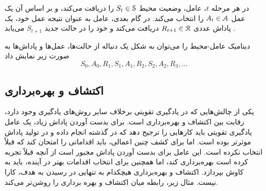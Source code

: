 در هر مرحله $t$، عامل، وضعیت محیط  
$S_t \in \EuScript{S}$
را دریافت می‌کند، و بر اساس آن یک عمل 
$A_t \in \EuScript{A}$
را انتخاب می‌کند. در گام بعدی، عامل به عنوان نتیجه عمل خود، یک پاداش عددی $R_{t+1} \in \EuScript{R}$ دریافت می‌کند و خود را در حالت جدید $S_{t+1}$ می‌یابد \cite{suttonbook}.


دینامیک عامل-محیط را می‌توان به شکل یک دنباله از حالت‌ها، عمل‌ها و پاداش‌ها به صورت زیر نمایش داد
$$S_0, A_0, R_1, S_1, A_1, R_2, S_2, A_2, R_3,...$$
\subsection*{اکتشاف و بهره‌برداری}
یکی از چالش‌هایی که در یادگیری تقویتی برخلاف سایر روش‌های یادگیری وجود دارد، رقابت بین اکتشاف و بهره‌برداری است. برای بدست آوردن پاداش زیاد، یک عامل یادگیری تقویتی باید کارهایی را ترجیح دهد که در گذشته انجام داده و در تولید پاداش موثرتر بوده است. اما برای کشف چنین اعمالی، باید اقداماتی را امتحان کند که قبلاً انتخاب نکرده است. این عامل برای بدست آوردن پاداش مجبور است از آنچه قبلاً تجربه کرده است بهره‌برداری کند، اما همچنین برای انتخاب اقدامات بهتر در آینده، باید به کاوش بپردازد. 
اکتشاف و بهره‌برداری هیچکدام به تنهایی در رسیدن به هدف، کارا نیست. مثال زیر، رابطه میان اکتشاف و بهره برداری را روشن‌تر می‌کند.
